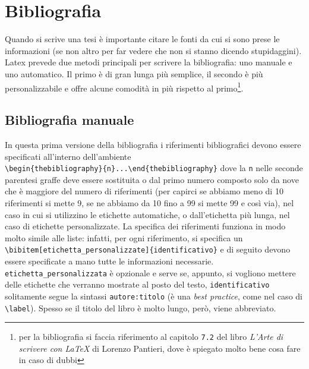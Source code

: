 \chapter{Bibliografia}
Quando si scrive una tesi è importante citare le fonti da cui si sono prese le
informazioni (se non altro per far vedere che non si stanno dicendo
stupidaggini). Latex prevede due metodi principali per scrivere la
bibliografia: uno manuale e uno automatico. Il primo è di gran lunga più
semplice, il secondo è più personalizzabile e offre alcune comodità in più
rispetto al primo\footnote{per la bibliografia si faccia riferimento al
capitolo \texttt{7.2} del libro \textit{L'Arte di scrivere con \LaTeX{}} di
Lorenzo Pantieri, dove è spiegato molto bene cosa fare in caso di dubbi}.

\section{Bibliografia manuale} \label{sec:bibman}
In questa prima versione della bibliografia i riferimenti bibliografici devono
essere specificati all'interno dell'ambiente \\
\verb!\begin{thebibliography}{n}...\end{thebibliography}! dove la \texttt{n}
nelle seconde parentesi graffe deve essere sostituita o dal primo numero
composto solo da nove che è maggiore del numero di riferimenti (per capirci se
abbiamo meno di 10 riferimenti si mette 9, se ne abbiamo da 10 fino a 99 si
mette 99 e così via), nel caso in cui si utilizzino le etichette automatiche,
o dall'etichetta più lunga, nel caso di etichette personalizzate. La specifica
dei riferimenti funziona in modo molto simile alle liste: infatti, per ogni
riferimento, si specifica un
\verb!\bibitem[etichetta_personalizzate]{identificativo}! e di seguito devono
essere specificate a mano tutte le informazioni necessarie.
\verb!etichetta_personalizzata! è opzionale e serve se, appunto, si vogliono
mettere delle etichette che verranno mostrate al posto del testo,
\verb!identificativo! solitamente segue la sintassi \verb!autore:titolo! (è
una \textit{best practice}, come nel caso di \verb!\label!). Spesso se il
titolo del libro è molto lungo, però, viene abbreviato.

